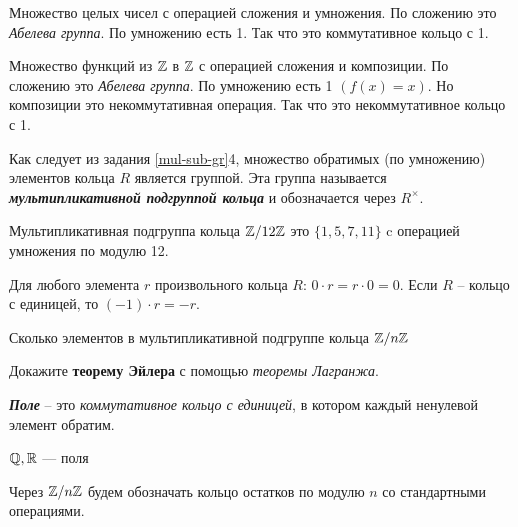 \documentclass{article}
\begin{document}
\begin{example}
	Множество целых чисел с операцией сложения и умножения. По сложению это \textit{Абелева группа}. По умножению есть 1. Так что это коммутативное кольцо с 1.
\end{example}

\begin{example}
	Множество функций из $\mathbb{Z}$ в $\mathbb{Z}$ с операцией сложения и композиции. По сложению это \textit{Абелева группа}. По умножению есть 1 $(f(x) = x)$. Но композиции это некоммутативная операция. Так что это некоммутативное кольцо с 1.
\end{example}

\begin{definition_boxed}
	Как следует из задания \ref{mul-sub-gr}4, множество обратимых (по умножению) элементов кольца $R$ является группой. Эта группа называется \textbf{\textit{мультипликативной подгруппой кольца}} и обозначается через $R^\times$.
\end{definition_boxed}
\begin{example}
	Мультипликативная подгруппа кольца $\mathbb{Z}/12\mathbb{Z}$ это $\{1,5,7,11\}$ c операцией умножения по модулю 12.
\end{example}
	

\begin{task_boxed}
	Для любого элемента $r$ произвольного кольца $R$: $0 \cdot r = r \cdot 0 = 0$. Если $R$ – кольцо с единицей, то $(-1) \cdot r = -r$.
\end{task_boxed}

\begin{task_boxed}
Сколько элементов в мультипликативной подгруппе кольца $\mathbb{Z}/n\mathbb{Z}$
\end{task_boxed}


\begin{task_boxed}
	Докажите \textbf{теорему Эйлера} с помощью \textit{теоремы Лагранжа}.
\end{task_boxed}


\begin{definition_boxed}
	\textbf{\textit{Поле}} – это\textit{ коммутативное кольцо с единицей}, в котором каждый ненулевой элемент обратим.
\end{definition_boxed}

\begin{example}
	$ \mathbb{Q}, \mathbb{R} $ --- поля
\end{example}


\begin{example}
	Через $\mathbb{Z}/n\mathbb{Z}$ будем обозначать кольцо остатков по модулю $n$ со стандартными операциями.
\end{example}
\end{document}
